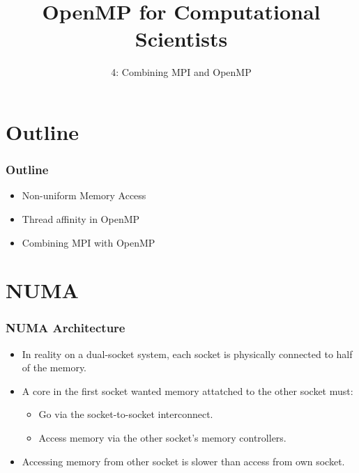 \documentclass{beamer}
\title{OpenMP for Computational Scientists}
\subtitle{4: Combining MPI and OpenMP}
\begin{document}
\frame{\titlepage}

\section{Outline}
\begin{frame}
\frametitle{Outline}
\begin{itemize}
  \item Non-uniform Memory Access
  \item Thread affinity in OpenMP
  \item Combining MPI with OpenMP
\end{itemize}
\end{frame}

\section{NUMA}
\begin{frame}
\frametitle{NUMA Architecture}
\begin{itemize}
  \item In reality on a dual-socket system, each socket is physically connected to half of the memory.
  \item A core in the first socket wanted memory attatched to the other socket must:
    \begin{itemize}
      \item Go via the socket-to-socket interconnect.
      \item Access memory via the other socket's memory controllers.
    \end{itemize}
  \item Accessing memory from other socket is slower than access from own socket.
\end{itemize}
\begin{center}
\end{center}
\end{frame}
\end{document}
